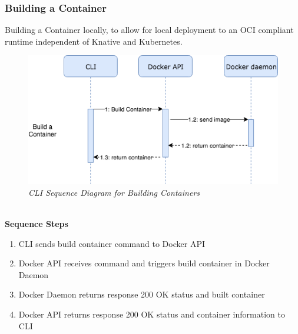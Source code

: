 \subsubsection{Building a Container}
Building a Container locally, to allow for local deployment to an OCI compliant runtime independent of Knative and Kubernetes.
\begin{figure}[!hb]
\centering
\includegraphics*[width=1\textwidth]{images/sec-build-con.png}
\caption{\em CLI Sequence Diagram for Building Containers}
\label{img:cli_seq2}
\end{figure}
\\\textbf{Sequence Steps}
\begin{enumerate}
  \item CLI sends build container command to Docker API
  \item Docker API receives command and triggers build container in Docker Daemon
  \item Docker Daemon returns response 200 OK status and built container
  \item Docker API returns response 200 OK status and container information to CLI
\end{enumerate}
\clearpage

